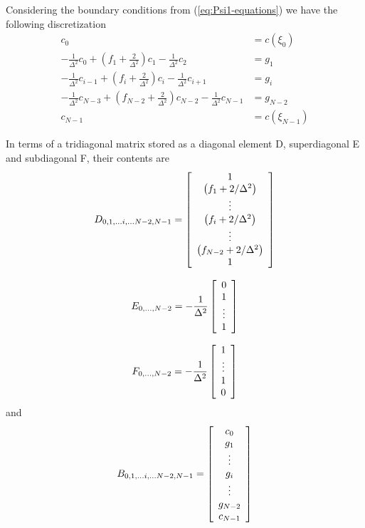 \documentclass[12pt]{article}%
\begin{document}
Considering the boundary conditions from (\ref{eq:Psi1-equations}) we have the
following discretization%
\begin{align}
c_{0}  &  =c(\xi_{0})\\
-\frac{1}{\Delta^{2}}c_{0}+\left(  f_{1}+\frac{2}{\Delta^{2}}\right)
c_{1}-\frac{1}{\Delta^{2}}c_{2}  &  =g_{1}\\
-\frac{1}{\Delta^{2}}c_{i-1}+\left(  f_{i}+\frac{2}{\Delta^{2}}\right)
c_{i}-\frac{1}{\Delta^{2}}c_{i+1}  &  =g_{i}\\
-\frac{1}{\Delta^{2}}c_{N-3}+\left(  f_{N-2}+\frac{2}{\Delta^{2}}\right)
c_{N-2}-\frac{1}{\Delta^{2}}c_{N-1}  &  =g_{N-2}\\
c_{N-1}  &  =c\left(  \xi_{N-1}\right)
\end{align}


In terms of a tridiagonal matrix stored as a diagonal element D, superdiagonal
E and subdiagonal F, their contents are%
\begin{equation}
D_{0,1,\ldots i,\ldots N-2,N-1}=\left[
\begin{array}
[c]{c}%
1\\
\left(  f_{1}+2/\Delta^{2}\right) \\
\vdots\\
\left(  f_{i}+2/\Delta^{2}\right) \\
\vdots\\
\left(  f_{N-2}+2/\Delta^{2}\right) \\
1
\end{array}
\right]  \label{eq:Psi_1--D-vec}%
\end{equation}
%

\begin{equation}
E_{0,\ldots,N-2}=-\frac{1}{\Delta^{2}}\left[
\begin{array}
[c]{c}%
0\\
1\\
\vdots\\
1
\end{array}
\right]  \label{eq:Psi_1--Evec}%
\end{equation}
%

\begin{equation}
F_{0,\ldots,N-2}=-\frac{1}{\Delta^{2}}\left[
\begin{array}
[c]{c}%
1\\
\vdots\\
1\\
0
\end{array}
\right]  \label{eq:Psi_1--Fvec}%
\end{equation}
and%
\begin{equation}
B_{0,1,\ldots i,\ldots N-2,N-1}=\left[
\begin{array}
[c]{c}%
c_{0}\\
g_{1}\\
\vdots\\
g_{i}\\
\vdots\\
g_{N-2}\\
c_{N-1}%
\end{array}
\right]
\end{equation}


\end{document}
